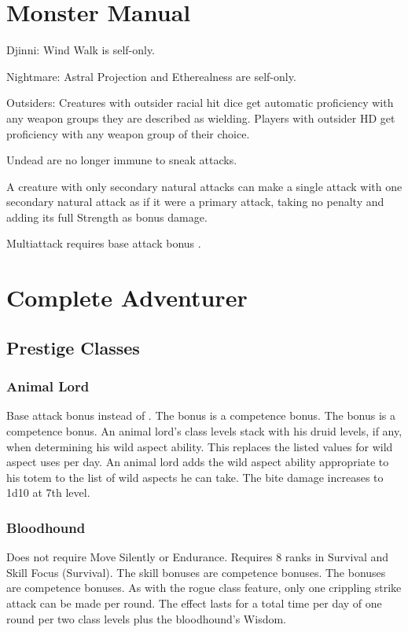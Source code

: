 \section{Monster Manual}
\begin{itemize*}
\item Djinni: Wind Walk is self-only.
\item Nightmare: Astral Projection and Etherealness are self-only.
\item Outsiders: Creatures with outsider racial hit dice get automatic proficiency with any weapon groups they are described as wielding. Players with outsider HD get proficiency with any weapon group of their choice.
\item Undead are no longer immune to sneak attacks.
\item A creature with only secondary natural attacks can make a single attack with one secondary natural attack as if it were a primary attack, taking no penalty and adding its full Strength as bonus damage.
\item Multiattack requires base attack bonus .
\end{itemize*}

\section{Complete Adventurer}
\subsection{Prestige Classes}
\subsubsection{Animal Lord}
 Base attack bonus  instead of .
 The bonus is a competence bonus.
 The bonus is a competence bonus.
 An animal lord's class levels stack with his druid levels, if any, when determining his wild aspect ability. This replaces the listed values for wild aspect uses per day. An animal lord adds the wild aspect ability appropriate to his totem to the list of wild aspects he can take.
 The bite damage increases to 1d10 at 7th level.
\subsubsection{Bloodhound}
 Does not require Move Silently or Endurance. Requires 8 ranks in Survival and Skill Focus (Survival).
 The skill bonuses are competence bonuses.
 The bonuses are competence bonuses.
 As with the rogue class feature, only one crippling strike attack can be made per round.
 The effect lasts for a total time per day of one round per two class levels plus the bloodhound's Wisdom.
